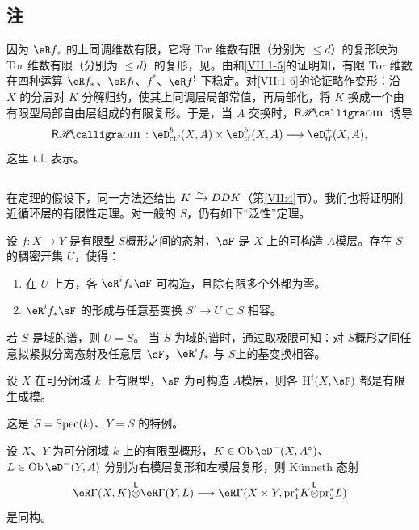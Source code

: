 \subsection{注}\label{VII:1-7}
因为 $\eR f_\ast$ 的上同调维数有限，它将 Tor 维数有限（分别为 $\leqslant d$）的复形映为 Tor 维数有限（分别为 $\leqslant d$）的复形，见\cite[XVII 5.2.11]{sga4}。由\cite[XVII 5.2.10]{sga4}和\ref{VII:1-5}的证明知，有限 Tor 维数在四种运算 $\eR f_\ast$、$\eR f_!$、$f^\ast$、$\eR f^!$ 下稳定。对\ref{VII:1-6}的论证略作变形：沿 $X$ 的分层对 $K$ 分解归约，使其上同调层局部常值，再局部化，将 $K$ 换成一个由有限型局部自由层组成的有限复形。于是，当 $A$ 交换时，$\rHom$ 诱导
\[
 \rHom:\eD_{\mathrm{ctf}}^b(X,A)\times\eD_{\mathrm{tf}}^b(X,A)\longrightarrow\eD_{\mathrm{tf}}^+(X,A),
\]
这里 t.f. 表示。
\subsection{}\label{VII:1-8}
在定理的假设下，同一方法还给出 $K\xrightarrow\sim DDK$（第\ref{VII:4}节）。我们也将证明附近循环层的有限性定理。对一般的 $S$，仍有如下“泛性”定理。
\begin{theorem_}\label{VII:1-9}
设 $f:X\to Y$ 是有限型 $S$概形之间的态射，$\sF$ 是 $X$ 上的可构造 $A$模层。存在 $S$ 的稠密开集 $U$，使得：
\begin{enumerate}[\indent (i)]
\item 在 $U$ 上方，各 $\eR^i f_\ast\sF$ 可构造，且除有限多个外都为零。
\item $\eR^i f_\ast\sF$ 的形成与任意基变换 $S'\to U\subset S$ 相容。
\end{enumerate}
\end{theorem_}
若 $S$ 是域的谱，则 $U=S$。
当 $S$ 为域的谱时，通过取极限可知：对 $S$概形之间任意拟紧拟分离态射及任意层 $\sF$，$\eR^i f_\ast$ 与 $S$上的基变换相容。
\begin{corollary_}\label{VII:1-10}
设 $X$ 在可分闭域 $k$ 上有限型，$\sF$ 为可构造 $A$模层，则各 $\h^i(X,\sF)$ 都是有限生成模。
\end{corollary_}
这是 $S=\operatorname{Spec}(k)$、$Y=S$ 的特例。
\begin{corollary_}\label{VII:1-11}
设 $X$、$Y$ 为可分闭域 $k$ 上的有限型概形，$K\in\ob\eD^-(X,A^\circ)$、$L\in\ob\eD^-(Y,A)$ 分别为右模层复形和左模层复形，则 Künneth 态射
\[
 \eR\Gamma(X,K)\lotimes\eR\Gamma(Y,L)\longrightarrow\eR\Gamma(X\times Y,\pr_1^\ast K\lotimes\pr_2^\ast L)
\]
是同构。
\end{corollary_}
